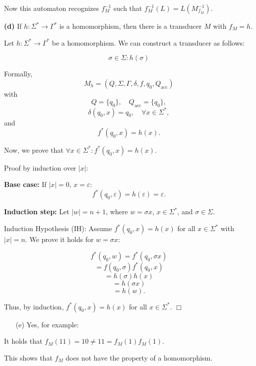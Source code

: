 Now this automaton recognizes $f_M^{-1}$ such that $f_M^{-1}(L) = L(M_{f_M}^{-1})$.



\noindent
\textbf{(d)} If \( h: \Sigma^* \to \Gamma^* \) is a homomorphism, then there is a transducer \( M \) with \( f_M = h \).

Let \( h: \Sigma^* \to \Gamma^* \) be a homomorphism.  
We can construct a transducer as follows:

\[
\sigma \in \Sigma: h(\sigma)
\]

Formally, 
\[
M_h = (Q, \Sigma, \Gamma, \delta, f, q_0, Q_{\text{acc}})
\]
with
\[
Q = \{ q_0 \}, \quad Q_{\text{acc}} = \{ q_0 \},
\]
\[
\delta(q_0, x) = q_0, \quad \forall x \in \Sigma^*,
\]
and
\[
f^*(q_0, x) = h(x).
\]

Now, we prove that \( \forall x \in \Sigma^* : f^*(q_0, x) = h(x) \).

Proof by induction over \( |x| \):  

\textbf{Base case:}  
If \( |x| = 0 \), \( x = \varepsilon \):  
\[
f^*(q_0, \varepsilon) = h(\varepsilon) = \varepsilon.
\]

\textbf{Induction step:}  
Let \( |w| = n + 1 \), where \( w = \sigma x \), \( x \in \Sigma^* \), and \( \sigma \in \Sigma \).

Induction Hypothesis (IH): Assume \( f^*(q_0, x) = h(x) \) for all \( x \in \Sigma^* \) with \( |x| = n \).  
We prove it holds for \( w = \sigma x \):  

\[
f^*(q_0, w) = f^*(q_0, \sigma x)
\]
\[
= f(q_0, \sigma) f^*(q_0, x)
\]
\[
= h(\sigma) h(x)
\]
\[
= h(\sigma x)
\]
\[
= h(w).
\]

Thus, by induction, \( f^*(q_0, x) = h(x) \) for all \( x \in \Sigma^* \). \(\Box\)

\begin{itemize}
    \item[(e)] Yes, for example:
\end{itemize}
\begin{center}
\end{center}

It holds that $f_M(11) = 10 \neq 11 = f_M(1)f_M(1)$.

This shows that $f_M$ does not have the property of a homomorphism.



